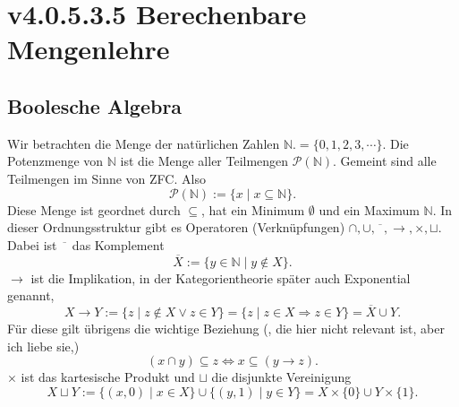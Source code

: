 \documentclass[a4paper]{amsart}
\theoremstyle{definition}
\newcommand{\N}{\ensuremath{\mathbb{ N }}}
\newcommand{\PP}{\ensuremath{\mathcal{ P }}}
\begin{document}
\section{v4.0.5.3.5 Berechenbare Mengenlehre}

\subsection{Boolesche Algebra}
Wir betrachten die Menge der natürlichen Zahlen $\N .= \{ 0, 1, 2, 3, \cdots \}$. Die Potenzmenge von $\N$ ist die Menge aller Teilmengen $\PP(\N)$. Gemeint sind alle Teilmengen im Sinne von ZFC. Also
\begin{equation}\label{Potenzmenge}
   \PP(\N) := \{ x \mid x \subseteq \N \}.
\end{equation}
Diese Menge ist geordnet durch $\subseteq$, hat ein Minimum $\emptyset$ und ein Maximum $\N$. In dieser Ordnungsstruktur gibt es Operatoren (Verknüpfungen) $\cap, \cup, \overline{\phantom{x}}, \rightarrow, \times, \sqcup$. Dabei ist $\overline{\phantom{x}}$ das Komplement
\begin{equation}\label{Komplement}
   \overline{X} := \{ y \in \N \mid y \notin X\}. 
\end{equation}
$\rightarrow$ ist die Implikation, in der Kategorientheorie später auch Exponential genannt,
\begin{equation}\label{Implikation}
   X \rightarrow Y := \{ z \mid z \notin X \lor z \in Y\} = \{ z \mid z \in X \Rightarrow z \in Y\} = \overline{X} \cup Y.
\end{equation}
Für diese gilt übrigens die wichtige Beziehung (, die hier nicht relevant ist, aber ich liebe sie,)
\begin{equation}\label{key}
   (x \cap y ) \subseteq z \Leftrightarrow x \subseteq (y \rightarrow z). 
\end{equation}
$\times$ ist das kartesische Produkt und $\sqcup$ die disjunkte Vereinigung
\begin{equation}\label{disjunkteVereinigung}
   X \sqcup Y := \{ (x,0) \mid x \in X\} \cup \{ (y,1) \mid y \in Y\} = X \times \{0\} \cup Y \times \{1\}.
\end{equation} 
\end{document}
